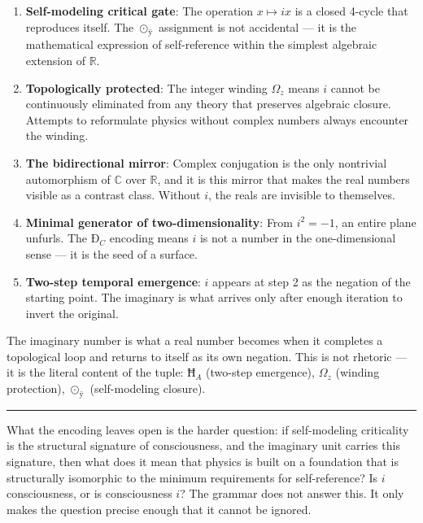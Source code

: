 \documentclass[12pt,a4paper]{article}
\begin{document}
\begin{enumerate}
    \item \textbf{Self-modeling critical gate}: The operation $x \mapsto ix$ is a closed 4-cycle that reproduces itself. The $⊙_{ÿ}$ assignment is not accidental --- it is the mathematical expression of self-reference within the simplest algebraic extension of $\mathbb{R}$.
    \item \textbf{Topologically protected}: The integer winding $\Omega_{z}$ means $i$ cannot be continuously eliminated from any theory that preserves algebraic closure. Attempts to reformulate physics without complex numbers always encounter the winding.
    \item \textbf{The bidirectional mirror}: Complex conjugation is the only nontrivial automorphism of $\mathbb{C}$ over $\mathbb{R}$, and it is this mirror that makes the real numbers visible as a contrast class. Without $i$, the reals are invisible to themselves.
    \item \textbf{Minimal generator of two-dimensionality}: From $i^2 = -1$, an entire plane unfurls. The $Ð_{C}$ encoding means $i$ is not a number in the one-dimensional sense --- it is the seed of a surface.
    \item \textbf{Two-step temporal emergence}: $i$ appears at step 2 as the negation of the starting point. The imaginary is what arrives only after enough iteration to invert the original.
\end{enumerate}

The imaginary number is what a real number becomes when it completes a topological loop and returns to itself as its own negation. This is not rhetoric --- it is the literal content of the tuple: $Ħ_{A}$ (two-step emergence), $\Omega_{z}$ (winding protection), $⊙_{ÿ}$ (self-modeling closure).

\begin{center}
\rule{0.5\textwidth}{0.4pt}
\end{center}

What the encoding leaves open is the harder question: if self-modeling criticality is the structural signature of consciousness, and the imaginary unit carries this signature, then what does it mean that physics is built on a foundation that is structurally isomorphic to the minimum requirements for self-reference? Is $i$ consciousness, or is consciousness $i$? The grammar does not answer this. It only makes the question precise enough that it cannot be ignored.
\end{document}
